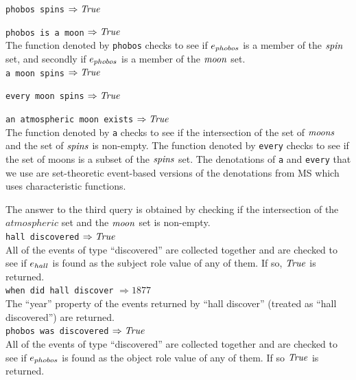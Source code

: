 \documentclass[../main.tex]{subfiles}
\begin{document}
\begin{refsection}
\texttt{phobos spins} $\Rightarrow \mathit{True}$

\noindent \texttt{phobos is a moon} $\Rightarrow \mathit{True}$ \\

The function denoted by \texttt{phobos} checks to see if $e_{phobos}$ is a member of the $\mathit{spin}$ set, and secondly if $e_{phobos}$ is a member of the $\mathit{moon}$ set. \\

\noindent \texttt{a moon spins} $\Rightarrow \mathit{True}$

\noindent \texttt{every moon spins} $\Rightarrow \mathit{True}$

\noindent \texttt{an atmospheric moon exists} $\Rightarrow \mathit{True}$ \\

The function denoted by \texttt{a} checks to see if the intersection of the set of $\mathit{moons}$ and the set of $\mathit{spins}$ is non-empty. The function denoted by \texttt{every} checks to see if the set of moons is a subset of the $\mathit{spins}$ set. The denotations of \texttt{a} and \texttt{every} that we use are set-theoretic event-based versions of the denotations from MS which uses characteristic functions.

The answer to the third query is obtained by checking if the intersection of the $\mathit{atmospheric}$ set and the $\mathit{moon}$ set is non-empty. \\

\noindent \texttt{hall discovered} $\Rightarrow \mathit{True}$ \\

All of the events of type ``discovered'' are collected together and are checked to see if $e_{hall}$ is found as the subject role value of any of them. If so, $\mathit{True}$ is returned. \\

\noindent \texttt{when did hall discover} $\Rightarrow \mathit{1877}$ \\

The ``year'' property of the  events returned by ``hall discover'' (treated as ``hall discovered'') are returned. \\

\noindent \texttt{phobos was discovered} $\Rightarrow \mathit{True}$ \\

All of the events of type ``discovered'' are collected together and are checked to see if $e_{phobos}$ is found as the object role value of any of them. If so $\mathit{True}$ is returned. \\\


\end{refsection}
\end{document}
